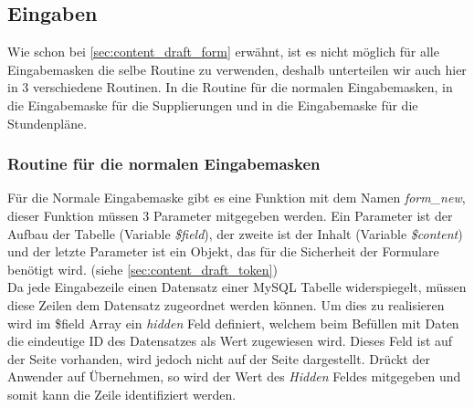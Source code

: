 \subsection{Eingaben}
%
%
%
% 
%
Wie schon bei \autoref{sec:content_draft_form} erwähnt, ist es nicht möglich für alle Eingabemasken die selbe Routine zu verwenden, deshalb unterteilen wir auch hier in 3 verschiedene Routinen. In die Routine für die normalen Eingabemasken, in die Eingabemaske für die Supplierungen und in die Eingabemaske für die Stundenpläne.
\subsubsection{Routine für die normalen Eingabemasken}
Für die Normale Eingabemaske gibt es eine Funktion mit dem Namen \textit{form\_new}, dieser Funktion müssen 3 Parameter mitgegeben werden. Ein Parameter ist der Aufbau der Tabelle (Variable \textit{\$field}), der zweite ist der Inhalt (Variable \textit{\$content}) und der letzte Parameter ist ein Objekt, das für die Sicherheit der Formulare benötigt wird. (siehe \autoref{sec:content_draft_token})\\
Da jede Eingabezeile einen Datensatz einer MySQL Tabelle widerspiegelt,
müssen diese Zeilen dem Datensatz zugeordnet werden können. Um dies zu realisieren wird im \$field Array ein \textit{hidden} Feld definiert, welchem beim Befüllen mit Daten die eindeutige ID des Datensatzes als Wert zugewiesen wird. Dieses Feld ist auf der Seite vorhanden, wird jedoch nicht auf der Seite dargestellt. Drückt der Anwender auf Übernehmen, so wird der Wert des \textit{Hidden} Feldes mitgegeben und somit kann die Zeile identifiziert werden.\\
